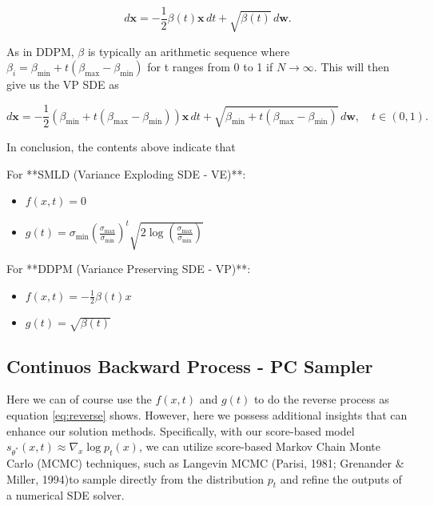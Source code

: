 \begin{equation}
d \mathbf{x} = -\frac{1}{2} \beta(t) \mathbf{x} \, dt + \sqrt{\beta(t)} \, d\mathbf{w}.
\end{equation}

\noindent
As in DDPM, $\beta$ is typically an arithmetic sequence where $\beta_i = \beta_{\min} + t (\beta_{\max} - \beta_{\min}) $ for t ranges from 0 to 1 if \( N \to \infty \). This will then give us the VP SDE as

\begin{equation}
    d \mathbf{x} = -\frac{1}{2} \left( \beta_{\min} + t (\beta_{\max} - \beta_{\min} )\right) \mathbf{x} \, dt + \sqrt{\beta_{\min} + t (\beta_{\max} - \beta_{\min})} \, d\mathbf{w}, \quad t \in (0, 1).
\end{equation}

\noindent
In conclusion, the contents above indicate that 

\noindent
For **SMLD (Variance Exploding SDE - VE)**:
\begin{itemize}
    \item \( f(x, t) = 0 \)
    \item \( g(t) = \sigma_{\min} \left( \frac{\sigma_{\max}}{\sigma_{\min}} \right)^t \sqrt{2 \log \left( \frac{\sigma_{\max}}{\sigma_{\min}} \right)} \)
\end{itemize}

\vspace{1em}

\noindent
For **DDPM (Variance Preserving SDE - VP)**:
\begin{itemize}
    \item \( f(x, t) = -\frac{1}{2} \beta(t) x \)
    \item \( g(t) = \sqrt{\beta(t)} \)
\end{itemize}

\subsection{Continuos Backward Process - PC Sampler}

Here we can of course use the $f(x,t)$ and $g(t)$ to do the reverse process as equation \eqref{eq:reverse} shows. However, here we possess additional insights that can enhance our solution methods. Specifically, with our score-based model 
$s_{\theta^*}(x, t) \approx \nabla_x \log p_t(x)
$, we can utilize score-based Markov Chain Monte Carlo (MCMC) techniques, such as Langevin MCMC (Parisi, 1981; Grenander \& Miller, 1994)to sample directly from the distribution $p_t$ and refine the outputs of a numerical SDE solver.

